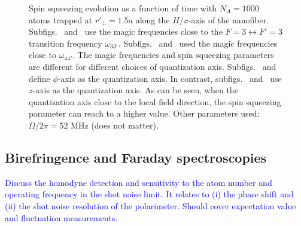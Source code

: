 \documentclass[preprint,aps,pra,onecolumn]{revtex4-1} %
\begin{document}
\begin{figure}[ht]
\caption{Spin squeezing evolution as a function of time with $ N_A=1000 $ atoms trapped at $ r'\!_\perp =1.5a $ along the $ H/x $-axis of the nanofiber. Subfigs.~\protect{} and~\protect{} use the magic frequencies close to the $ F=3\leftrightarrow F'=3 $ transition frequency $ \omega_{33'} $. Subfigs.~\protect{} and~\protect{} used the magic frequencies close to $ \omega_{44'} $. The magic frequencies and spin squeezing parameters are different for different choices of quantization axis. Subfigs.~\protect{} and~\protect{} define $ \phi $-axis as the quantization axis. In contrast, subfigs.~\protect{} and~\protect{} use $ z $-axis as the quantization axis. As can be seen, when the quantization axis close to the local field direction, the spin squeezing parameter can reach to a higher value. Other parameters used: $ \Omega/2\pi=52 $ MHz (does not matter). }\label{fig:xi_magic}
\end{figure}





\subsection{Birefringence and Faraday spectroscopies}

\textcolor{blue}{Discuss the homodyne detection and sensitivity to the atom number and operating frequency in the shot noise limit.  It relates to (i) the phase shift and (ii) the shot noise resolution of the polarimeter. Should cover expectation value and fluctuation measurements.}
\end{document}
